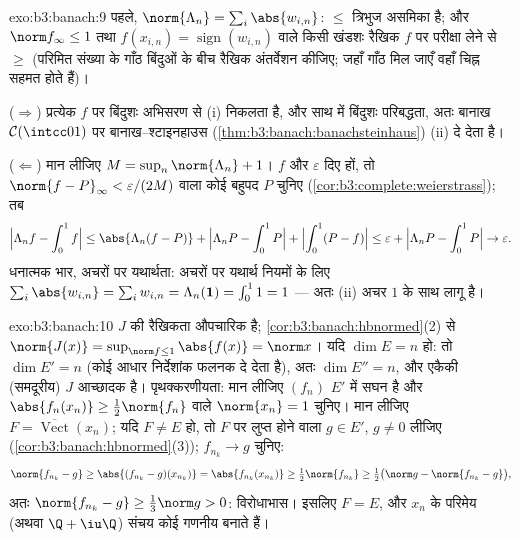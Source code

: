 \begin{solution}{exo:b3:banach:9}
पहले, $\norm{\Lambda_n} = \sum_i\abs{w_{i,n}}$: $\leq$ त्रिभुज असमिका है; और $\norm f_\infty \leq 1$ तथा $f(x_{i,n}) =
\operatorname{sign}(w_{i,n})$ वाले किसी
खंडशः रैखिक $f$ पर परीक्षा लेने से $\geq$ (परिमित संख्या के गाँठ
बिंदुओं के बीच रैखिक अंतर्वेशन कीजिए; जहाँ गाँठ मिल जाएँ वहाँ चिह्न
सहमत होते हैं)।

($\Rightarrow$) प्रत्येक $f$ पर बिंदुशः अभिसरण से (i) निकलता है, और साथ
में बिंदुशः परिबद्धता, अतः बानाख $\mathcal
C(\intcc01)$ पर बानाख--श्टाइनहाउस (\cref{thm:b3:banach:banachsteinhaus})
(ii) दे देता है।

($\Leftarrow$) मान लीजिए $M = \sup_n\norm{\Lambda_n} + 1$। $f$ और $\varepsilon$ दिए हों, तो $\norm{f -
P}_\infty < \varepsilon/(2M)$ वाला कोई
बहुपद $P$ चुनिए (\cref{cor:b3:complete:weierstrass}); तब
\[
\Bigl|\Lambda_n f - \int_0^1 f\Bigr|
\leq \abs{\Lambda_n(f - P)} + \Bigl|\Lambda_nP -
\int_0^1P\Bigr| + \Bigl|\int_0^1(P - f)\Bigr|
\leq \varepsilon + \Bigl|\Lambda_nP - \int_0^1P\Bigr| \to
\varepsilon .
\]
धनात्मक भार, अचरों पर यथार्थता: अचरों पर यथार्थ नियमों के लिए $\sum_i\abs{w_{i,n}}
= \sum_iw_{i,n} = \Lambda_n(\mathbf 1) = \int_0^1 1 = 1$
--- अतः (ii) अचर $1$ के साथ लागू है।
\end{solution}

\begin{solution}{exo:b3:banach:10}
$J$ की रैखिकता औपचारिक है; \cref{cor:b3:banach:hbnormed}(2) से $\norm{J(x)} = \sup_{\norm f \leq
1}\abs{f(x)} = \norm x$। यदि $\dim E = n$ हो: तो
$\dim E' =
n$ (कोई आधार निर्देशांक फलनक दे देता है), अतः $\dim E'' = n$, और एकैकी
(समदूरीय) $J$ आच्छादक है। पृथक्करणीयता: मान लीजिए $(f_n)$ $E'$ में
सघन है और $\abs{f_n(x_n)} \geq \frac12\norm{f_n}$ वाले $\norm{x_n} = 1$ चुनिए। मान लीजिए $F =
\overline{\operatorname{Vect}}(x_n)$; यदि $F \neq E$ हो,
तो $F$ पर लुप्त होने वाला $g
\in E'$, $g \neq 0$ लीजिए (\cref{cor:b3:banach:hbnormed}(3)); $f_{n_k} \to g$
चुनिए:
\[
\norm{f_{n_k} - g} \geq \abs{(f_{n_k} - g)(x_{n_k})}
= \abs{f_{n_k}(x_{n_k})} \geq \tfrac12\norm{f_{n_k}}
\geq \tfrac12\bigl(\norm g - \norm{f_{n_k} - g}\bigr),
\]
अतः $\norm{f_{n_k} - g} \geq \frac13\norm g > 0$: विरोधाभास। इसलिए $F = E$, और $x_n$ के परिमेय (अथवा $\Q + \iu\Q$)
संचय कोई गणनीय  बनाते हैं।
\end{solution}

